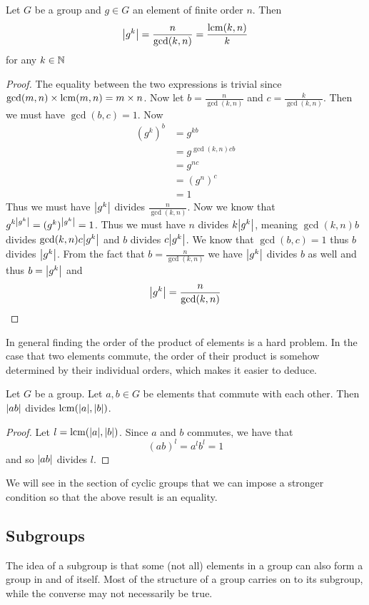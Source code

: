 \documentclass[a4paper]{article}
\begin{document}
\begin{prp}{}{} Let $G$ be a group and $g\in G$ an element of finite order $n$. Then $$\abs{g^k}=\frac{n}{\gcd(k,n)}=\frac{\operatorname{lcm}(k,n)}{k}$$ for any $k\in\mathbb{N}$\tcbline
\begin{proof} The equality between the two expressions is trivial since $\gcd(m,n)\times\operatorname{lcm}(m,n)=m\times n$. Now let $b=\frac{n}{\gcd(k,n)}$ and $c=\frac{k}{\gcd(k,n)}$. Then we must have $\gcd(b,c)=1$. Now
\begin{align*}
(g^k)^b&=g^{kb}\\
&=g^{\gcd(k,n)cb}\\
&=g^{nc}\\
&=(g^n)^c\\
&=1
\end{align*}
Thus we must have $\abs{g^k}$ divides $\frac{n}{\gcd(k,n)}$. Now we know that $g^{k\abs{g^k}}=(g^k)^{\abs{g^k}}=1$. Thus we must have $n$ divides $k\abs{g^k}$, meaning $\gcd(k,n)b$ divides $\gcd(k,n)c\abs{g^k}$ and $b$ divides $c\abs{g^k}$. We know that $\gcd(b,c)=1$ thus $b$ divides $\abs{g^k}$. From the fact that $b=\frac{n}{\gcd(k,n)}$ we have $\abs{g^k}$ divides $b$ as well and thus $b=\abs{g^k}$ and $$\abs{g^k}=\frac{n}{\gcd(k,n)}$$
\end{proof}
\end{prp}

In general finding the order of the product of elements is a hard problem. In the case that two elements commute, the order of their product is somehow determined by their individual orders, which makes it easier to deduce. 

\begin{lmm}{}{} Let $G$ be a group. Let $a,b\in G$ be elements that commute with each other. Then $\abs{ab}$ divides $\operatorname{lcm}(\abs{a},\abs{b})$. \tcbline
\begin{proof}
Let $l=\operatorname{lcm}(\abs{a},\abs{b})$. Since $a$ and $b$ commutes, we have that $$(ab)^l=a^lb^l=1$$ and so $\abs{ab}$ divides $l$. 
\end{proof}
\end{lmm}

We will see in the section of cyclic groups that we can impose a stronger condition so that the above result is an equality. 

\subsection{Subgroups}
The idea of a subgroup is that some (not all) elements in a group can also form a group in and of itself. Most of the structure of a group carries on to its subgroup, while the converse may not necessarily be true. 
\end{document}
